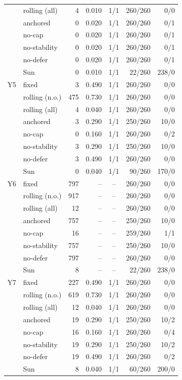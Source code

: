 \begin{tabular}{llrrcrr}
 & rolling (all) & 4 & 0.010 & 1/1 & 260/260 & 0/0 \\
 & anchored & 0 & 0.020 & 1/1 & 260/260 & 0/1 \\
 & no-cap & 0 & 0.020 & 1/1 & 260/260 & 0/1 \\
 & no-stability & 0 & 0.020 & 1/1 & 260/260 & 0/1 \\
 & no-defer & 0 & 0.020 & 1/1 & 260/260 & 0/1 \\
 & Sun & 0 & 0.010 & 1/1 & 22/260 & 238/0 \\
\midrule
Y5 & fixed & 3 & 0.490 & 1/1 & 260/260 & 0/0 \\
 & rolling (n.o.) & 475 & 0.730 & 1/1 & 260/260 & 0/0 \\
 & rolling (all) & 4 & 0.040 & 1/1 & 260/260 & 0/0 \\
 & anchored & 3 & 0.290 & 1/1 & 250/260 & 10/0 \\
 & no-cap & 0 & 0.160 & 1/1 & 260/260 & 0/2 \\
 & no-stability & 3 & 0.290 & 1/1 & 250/260 & 10/0 \\
 & no-defer & 3 & 0.490 & 1/1 & 260/260 & 0/0 \\
 & Sun & 0 & 0.040 & 1/1 & 90/260 & 170/0 \\
\midrule
Y6 & fixed & 797 & -- & -- & 260/260 & 0/0 \\
 & rolling (n.o.) & 917 & -- & -- & 260/260 & 0/0 \\
 & rolling (all) & 12 & -- & -- & 260/260 & 0/0 \\
 & anchored & 757 & -- & -- & 250/260 & 10/0 \\
 & no-cap & 16 & -- & -- & 259/260 & 1/1 \\
 & no-stability & 757 & -- & -- & 250/260 & 10/0 \\
 & no-defer & 797 & -- & -- & 260/260 & 0/0 \\
 & Sun & 8 & -- & -- & 22/260 & 238/0 \\
\midrule
Y7 & fixed & 227 & 0.490 & 1/1 & 260/260 & 0/0 \\
 & rolling (n.o.) & 619 & 0.730 & 1/1 & 260/260 & 0/0 \\
 & rolling (all) & 12 & 0.040 & 1/1 & 260/260 & 0/0 \\
 & anchored & 19 & 0.290 & 1/1 & 250/260 & 10/2 \\
 & no-cap & 16 & 0.160 & 1/1 & 260/260 & 0/4 \\
 & no-stability & 19 & 0.290 & 1/1 & 250/260 & 10/2 \\
 & no-defer & 19 & 0.490 & 1/1 & 260/260 & 0/2 \\
 & Sun & 8 & 0.040 & 1/1 & 60/260 & 200/0 \\
\bottomrule
\end{tabular}%
